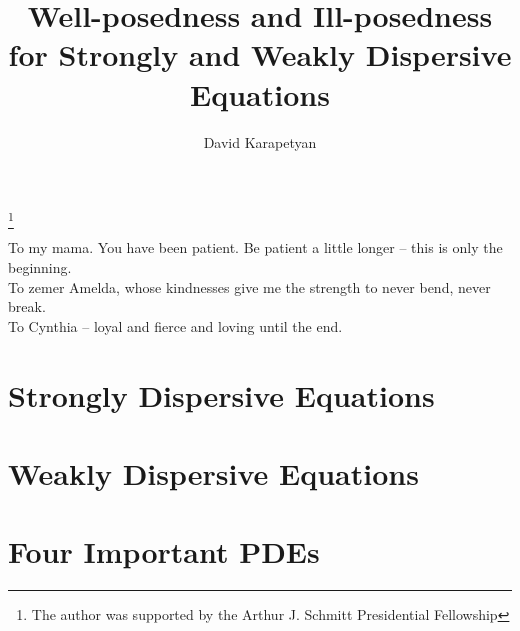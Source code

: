 \documentclass{amsbook}
\numberwithin{section}{chapter}
\numberwithin{equation}{chapter}  %
\theoremstyle{definition}
\theoremstyle{remark}
\begin{document}
\frontmatter
\title{Well-posedness and Ill-posedness for Strongly and Weakly Dispersive Equations}
\author{David Karapetyan}
\address{Department of Mathematics, University of Notre Dame, Notre Dame, IN 46556}

\thanks{The author was supported by the Arthur J. Schmitt Presidential Fellowship}

\date{}

\maketitle
\cleardoublepage
\thispagestyle{empty}
\vspace*{13.5pc}
\begin{center}
To my mama. You have been patient. Be patient a little longer -- this is only the
   beginning. 
   \\[2pt]
   \vspace{0.2in}
   To zemer Amelda, whose kindnesses
give me the strength to never bend, never break.
\\[2pt]
\vspace{0.2in}
To Cynthia -- loyal and fierce and loving until the end. 
\end{center}
\cleardoublepage

\setcounter{page}{6}
\tableofcontents


\mainmatter


\part{Strongly Dispersive Equations}



%


\part{Weakly Dispersive Equations}



\part{Four Important PDEs}




%
%
%
\backmatter %
%


%
\end{document}
